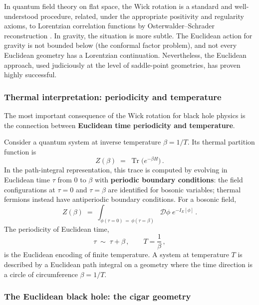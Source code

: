 \documentclass[11pt,letterpaper]{article}
\theoremstyle{plain}
\theoremstyle{definition}
\theoremstyle{remark}
\begin{document}
In quantum field theory on flat space, the Wick rotation is a standard and
well-understood procedure, related, under the appropriate positivity and regularity axioms, to
Lorentzian correlation functions by Osterwalder--Schrader reconstruction \citep{osterwalderschrader1973, osterwalderschrader1975}.  In gravity,
the situation is more subtle.  The Euclidean action for gravity is not bounded
below (the conformal factor problem), and not every Euclidean geometry has a
Lorentzian continuation.  Nevertheless, the Euclidean approach, used judiciously
at the level of saddle-point geometries, has proven highly successful.

\subsubsection*{Thermal interpretation: periodicity and temperature}

The most important consequence of the Wick rotation for black hole physics is
the connection between \textbf{Euclidean time periodicity and temperature}.

Consider a quantum system at inverse temperature $\beta = 1/T$.  Its thermal
partition function is
\begin{equation}\label{eq05:thermal_partition}
  Z(\beta) \;=\; \operatorname{Tr}\bigl(e^{-\beta H}\bigr)\,.
\end{equation}
In the path-integral representation, this trace is computed by evolving in
Euclidean time $\tau$ from $0$ to $\beta$ with \textbf{periodic boundary
conditions}: the field configurations at $\tau = 0$ and $\tau = \beta$ are
identified for bosonic variables; thermal fermions instead have
antiperiodic boundary conditions. For a bosonic field,
\begin{equation}\label{eq05:thermal_path_integral}
  Z(\beta) \;=\; \int_{\phi(\tau=0) \,=\, \phi(\tau=\beta)}
  \mathcal{D}\phi\; e^{-I_E[\phi]}\,.
\end{equation}
The periodicity of Euclidean time,
\begin{equation}\label{eq05:periodicity}
  \tau \;\sim\; \tau + \beta\,,
  \qquad
  T = \frac{1}{\beta}\,,
\end{equation}
is the Euclidean encoding of finite temperature.  A system at temperature $T$ is
described by a Euclidean path integral on a geometry where the time direction is
a circle of circumference $\beta = 1/T$.

\subsubsection*{The Euclidean black hole: the cigar geometry}
\end{document}
